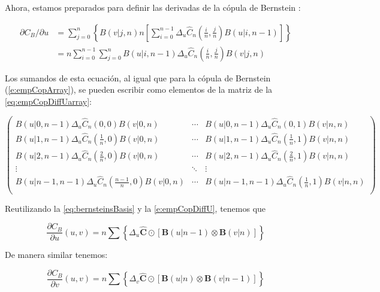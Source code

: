 Ahora, estamos preparados para definir las derivadas de la c\'opula de Bernstein \citep{phillips_interpolation_2003,sancetta_bernstein_2004}:

\begin{align}
	\partial C_B / \partial u
	&= \sum_{j=0}^n
	\left\{
		B(v|j,n) n 
		\left[
			\sum_{i=0}^{n-1} \Delta_u \hat{C}_n 
			\left(
				\frac{i}{n} , \frac{j}{n}
			\right)
			B(u|i,n-1)
		\right]
	\right\} \\
	&= n \sum_{i=0}^{n-1} \sum_{j=0}^n B(u|i,n-1) \Delta_u \hat{C}_n 
	\left(
		\frac{i}{n} , \frac{j}{n}
	\right)
	B(v|j,n) 
	\label{eq:bernsCopDerU}
\end{align}

Los sumandos de esta ecuaci\'on, al igual que para la c\'opula de Bernstein (\autoref{e:empCopArray}), se pueden escribir como elementos de la matriz de la \autoref{eq:empCopDiffUarray}:

\begin{equation}
	\begin{pmatrix}
		B(u|0,n-1)\Delta_u \hat{C}_n(0,0)B(v|0,n) & \cdots & B(u|0,n-1)\Delta_u \hat{C}_n(0,1)B(v|n,n) \\
		B(u|1,n-1)\Delta_u \hat{C}_n(\frac{1}{n},0)B(v|0,n) & \cdots & B(u|1,n-1)\Delta_u \hat{C}_n(\frac{1}{n},1)B(v|n,n) \\
		B(u|2,n-1)\Delta_u \hat{C}_n(\frac{2}{n},0)B(v|0,n) & \cdots & B(u|2,n-1)\Delta_u \hat{C}_n(\frac{2}{n},1)B(v|n,n) \\
		\vdots & \ddots & \vdots \\
		B(u|n-1,n-1)\Delta_u \hat{C}_n(\frac{n-1}{n},0)B(v|0,n) & \cdots & B(u|n-1,n-1)\Delta_u \hat{C}_n(\frac{1}{n},1)B(v|n,n) \\
	\end{pmatrix}
	\label{eq:empCopDiffUarray}
\end{equation}

Reutilizando la \autoref{eq:bernsteinsBasis} y la \autoref{e:empCopDiffU}, tenemos que

\begin{equation}
	\frac{\partial C_B}{\partial u}(u,v)
	= n \sum \left\{\Delta_u \mathbf{\hat{C}} \odot [\mathbf{B}(u|n-1) \otimes \mathbf{B}(v|n)] \right\}
	\label{e:copBernDiffComp}
\end{equation}

De manera similar tenemos:

\begin{equation}
	\frac{\partial C_B}{\partial v}(u,v)
	= n \sum \left\{\Delta_v \mathbf{\hat{C}} \odot [\mathbf{B}(u|n) \otimes \mathbf{B}(v|n-1)] \right\}
	\label{e:copBernDiffVComp}
\end{equation}

